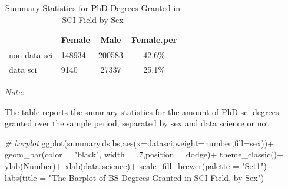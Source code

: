 \documentclass[
  12pt,
]{article}
\newenvironment{Shaded}{\begin{snugshade}}{\end{snugshade}}
\newcommand{\AttributeTok}[1]{\textcolor[rgb]{0.77,0.63,0.00}{#1}}
\newcommand{\CommentTok}[1]{\textcolor[rgb]{0.56,0.35,0.01}{\textit{#1}}}
\newcommand{\DecValTok}[1]{\textcolor[rgb]{0.00,0.00,0.81}{#1}}
\newcommand{\FunctionTok}[1]{\textcolor[rgb]{0.00,0.00,0.00}{#1}}
\newcommand{\NormalTok}[1]{#1}
\newcommand{\SpecialCharTok}[1]{\textcolor[rgb]{0.00,0.00,0.00}{#1}}
\newcommand{\StringTok}[1]{\textcolor[rgb]{0.31,0.60,0.02}{#1}}
\begin{document}
\begin{table}[H]

\caption{\label{tab:unnamed-chunk-12}Summary Statistics for PhD Degrees Granted in SCI Field by Sex}
\centering
\begin{threeparttable}
\begin{tabular}[t]{llcc}
\toprule
  & Female & Male & Female.per\\
\midrule
non-data sci & 148934 & 200583 & 42.6\%\\
data sci & 9140 & 27337 & 25.1\%\\
\bottomrule
\end{tabular}
\begin{tablenotes}
\item \textit{Note: } 
\item The table reports the summary statistics for the amount of PhD sci degrees granted over the sample period, separated by sex and data science or not.
\end{tablenotes}
\end{threeparttable}
\end{table}

\begin{Shaded}
\begin{Highlighting}[]
\CommentTok{\# barplot}
\FunctionTok{ggplot}\NormalTok{(summary.ds.bs,}\FunctionTok{aes}\NormalTok{(}\AttributeTok{x=}\NormalTok{datasci,}\AttributeTok{weight=}\NormalTok{number,}\AttributeTok{fill=}\NormalTok{sex))}\SpecialCharTok{+}
  \FunctionTok{geom\_bar}\NormalTok{(}\AttributeTok{color =} \StringTok{"black"}\NormalTok{, }\AttributeTok{width =}\NormalTok{ .}\DecValTok{7}\NormalTok{,}\AttributeTok{position =} \StringTok{\textquotesingle{}dodge\textquotesingle{}}\NormalTok{)}\SpecialCharTok{+}
  \FunctionTok{theme\_classic}\NormalTok{()}\SpecialCharTok{+}
  \FunctionTok{ylab}\NormalTok{(}\StringTok{\textquotesingle{}Number\textquotesingle{}}\NormalTok{)}\SpecialCharTok{+}
  \FunctionTok{xlab}\NormalTok{(}\StringTok{\textquotesingle{}data science\textquotesingle{}}\NormalTok{)}\SpecialCharTok{+}
  \FunctionTok{scale\_fill\_brewer}\NormalTok{(}\AttributeTok{palette =} \StringTok{"Set1"}\NormalTok{)}\SpecialCharTok{+}
  \FunctionTok{labs}\NormalTok{(}\AttributeTok{title =} \StringTok{"The Barplot of BS Degrees Granted in SCI Field, by Sex"}\NormalTok{)}
\end{Highlighting}
\end{Shaded}
\end{document}
